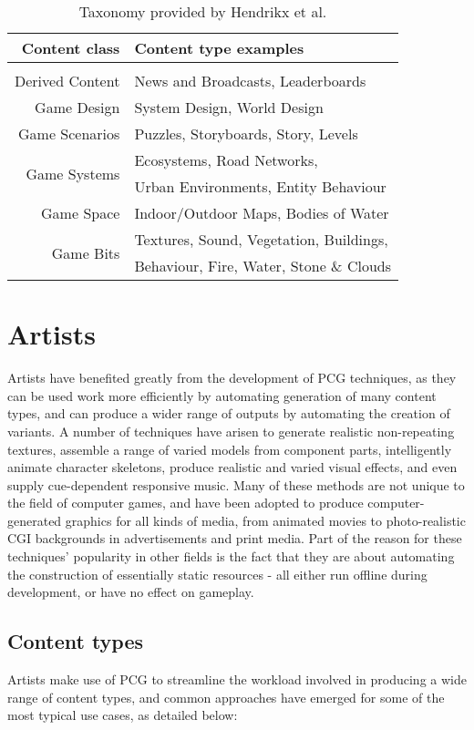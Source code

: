 \documentclass{acm_proc_article-sp}
\begin{document}
\begin{table}[!ht]
  \begin{tabular}{r|l}
  Content class		& Content type examples\\
  \hline 
   \\[-2ex]
  Derived Content	& News and Broadcasts, Leaderboards\\ [.5ex]
  Game Design		& System Design, World Design\\ [.5ex]
  Game Scenarios	& Puzzles, Storyboards, Story, Levels\\ [.5ex]
  \multirow{2}{*}{Game Systems}
  					& Ecosystems, Road Networks,\\
  					& Urban Environments, Entity Behaviour\\ [.5ex]
  Game Space		& Indoor/Outdoor Maps, Bodies of Water\\ [.5ex]
  \multirow{2}{*}{Game Bits}
  					& Textures, Sound, Vegetation, Buildings,\\
  					& Behaviour, Fire, Water, Stone \& Clouds\\ [-2ex]
  \end{tabular}
  \caption{Taxonomy provided by Hendrikx et al. \cite{hendrikx2012procedural}}
  \label{tab:hendrikx}
\end{table}

\section{Artists}
Artists have benefited greatly from the development of PCG techniques, as they can be used work more efficiently by automating generation of many content types, and can produce a wider range of outputs by automating the creation of variants. A number of techniques have arisen to generate realistic non-repeating textures, assemble a range of varied models from component parts, intelligently animate character skeletons, produce realistic and varied visual effects, and even supply cue-dependent responsive music. Many of these methods are not unique to the field of computer games, and have been adopted to produce computer-generated graphics for all kinds of media, from animated movies to photo-realistic CGI backgrounds in advertisements and print media. Part of the reason for these techniques' popularity in other fields is the fact that they are about automating the construction of essentially static resources - all either run offline during development, or have no effect on gameplay. 

\subsection{Content types}
Artists make use of PCG to streamline the workload involved in producing a wide range of content types, and common approaches have emerged for some of the most typical use cases, as detailed below:
\end{document}
